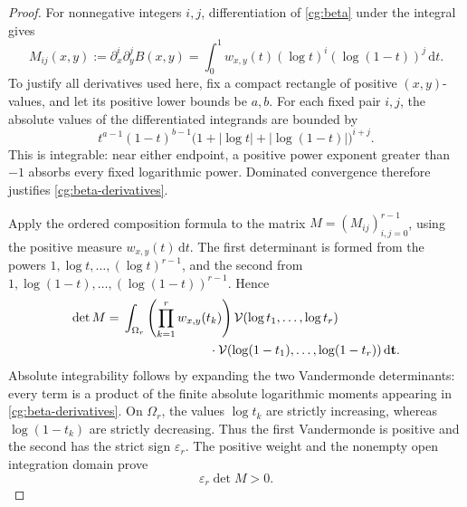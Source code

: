 \documentclass[11pt,a4paper]{article}
\theoremstyle{definition}
\theoremstyle{remark}
\newcommand{\dd}{\,\mathrm d}
\newcommand{\ep}{\varepsilon}
\newcommand{\V}{\mathcal V}
\begin{document}
\begin{proof}
For nonnegative integers \(i,j\), differentiation of
\eqref{cg:beta} under the integral gives
\begin{equation}\label{cg:beta-derivatives}
 M_{ij}(x,y):=\partial_x^i\partial_y^j B(x,y)
 =
 \int_0^1
   w_{x,y}(t)(\log t)^i(\log(1-t))^j\dd t .
\end{equation}
To justify all derivatives used here, fix a compact rectangle of positive
\((x,y)\)-values, and let its positive lower bounds be \(a,b\).
For each fixed pair \(i,j\), the absolute values of the differentiated
integrands are bounded by
\[
 t^{a-1}(1-t)^{b-1}
 \bigl(1+|\log t|+|\log(1-t)|\bigr)^{i+j}.
\]
This is integrable: near either endpoint, a positive power exponent
greater than \(-1\) absorbs every fixed logarithmic power. Dominated
convergence therefore justifies \eqref{cg:beta-derivatives}.

Apply the ordered composition formula to the matrix
\(M=(M_{ij})_{i,j=0}^{r-1}\), using the positive measure
\(w_{x,y}(t)\dd t\). The first determinant is formed from the powers
\(1,\log t,\ldots,(\log t)^{r-1}\), and the second from
\(1,\log(1-t),\ldots,(\log(1-t))^{r-1}\). Hence
\begin{equation}\label{cg:log-vandermonde-integral}
\begin{split}
 \det M
 ={}&\int_{\Omega_r}
   \left(\prod_{k=1}^{r}w_{x,y}(t_k)\right)
   \V(\log t_1,\ldots,\log t_r)\\
 &\hspace{24mm}\cdot
   \V(\log(1-t_1),\ldots,\log(1-t_r))
   \dd\mathbf t .
\end{split}
\end{equation}
Absolute integrability follows by expanding the two Vandermonde
determinants: every term is a product of the finite absolute logarithmic
moments appearing in \eqref{cg:beta-derivatives}.
On \(\Omega_r\), the values \(\log t_k\) are strictly increasing, whereas
\(\log(1-t_k)\) are strictly decreasing. Thus the first Vandermonde is
positive and the second has the strict sign \(\ep_r\). The positive
weight and the nonempty open integration domain prove
\begin{equation}\label{cg:strict-beta-derivative}
 \ep_r\det M>0.
\end{equation}


\end{proof}
\end{document}
